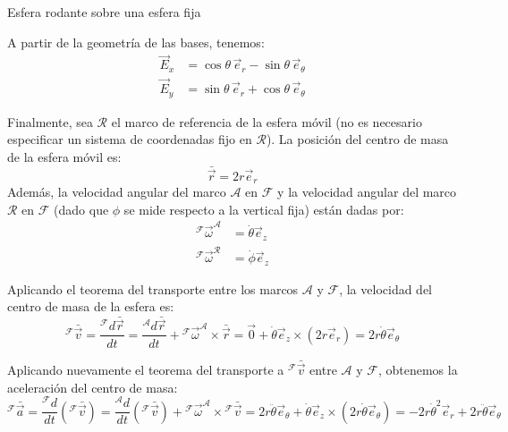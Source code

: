 \begin{solucion}{Esfera rodante sobre una esfera fija}
\begin{center}
\end{center}

A partir de la geometría de las bases, tenemos:
\begin{align}
    \vec{E}_x &= \cos\theta\,\vec{e}_r - \sin\theta\,\vec{e}_\theta \\
    \vec{E}_y &= \sin\theta\,\vec{e}_r + \cos\theta\,\vec{e}_\theta
\end{align}

Finalmente, sea $\mathcal{R}$ el marco de referencia de la esfera móvil (no es necesario especificar un sistema de coordenadas fijo en $\mathcal{R}$). La posición del centro de masa de la esfera móvil es:
\begin{equation}
    \bar{\vec{r}} = 2r\vec{e}_r
\end{equation}
Además, la velocidad angular del marco $\mathcal{A}$ en $\mathcal{F}$ y la velocidad angular del marco $\mathcal{R}$ en $\mathcal{F}$ (dado que $\phi$ se mide respecto a la vertical fija) están dadas por:
\begin{align}
    {}^{\mathcal{F}}\vec{\omega}^{\mathcal{A}} &= \dot{\theta}\vec{e}_z \\
    {}^{\mathcal{F}}\vec{\omega}^{\mathcal{R}} &= \dot{\phi}\vec{e}_z
\end{align}

Aplicando el teorema del transporte entre los marcos $\mathcal{A}$ y $\mathcal{F}$, la velocidad del centro de masa de la esfera es:
\begin{equation}
    {}^{\mathcal{F}}\bar{\vec{v}} = \frac{{}^{\mathcal{F}}d\bar{\vec{r}}}{dt} = \frac{{}^{\mathcal{A}}d\bar{\vec{r}}}{dt} + {}^{\mathcal{F}}\vec{\omega}^{\mathcal{A}} \times \bar{\vec{r}} = \vec{0} + \dot{\theta}\vec{e}_z \times (2r\vec{e}_r) = 2r\dot{\theta}\vec{e}_\theta
\end{equation}

Aplicando nuevamente el teorema del transporte a ${}^{\mathcal{F}}\bar{\vec{v}}$ entre $\mathcal{A}$ y $\mathcal{F}$, obtenemos la aceleración del centro de masa:
\begin{equation}
    {}^{\mathcal{F}}\bar{\vec{a}} = \frac{{}^{\mathcal{F}}d}{dt}({}^{\mathcal{F}}\bar{\vec{v}}) = \frac{{}^{\mathcal{A}}d}{dt}({}^{\mathcal{F}}\bar{\vec{v}}) + {}^{\mathcal{F}}\vec{\omega}^{\mathcal{A}} \times {}^{\mathcal{F}}\bar{\vec{v}} = 2r\ddot{\theta}\vec{e}_\theta + \dot{\theta}\vec{e}_z \times (2r\dot{\theta}\vec{e}_\theta) = -2r\dot{\theta}^2\vec{e}_r + 2r\ddot{\theta}\vec{e}_\theta
\end{equation}


\end{solucion}
